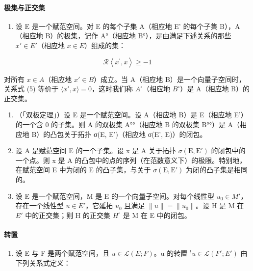 \paragraph{极集与正交集}

\begin{enumerate}
\def\labelenumi{\arabic{enumi})}
\setcounter{enumi}{4}
\tightlist
\item
  设 E 是一个赋范空间。对 E 的每个子集 A（相应地 E' 的每个子集 B），A（相应地 B）的极集，记作 A°（相应地 B°），是由满足下述关系的那些 \(x' \in E'\)（相应地 \(x \in E\)）组成的集：
\end{enumerate}

\[
\mathcal {R} \left<   x ^ {\prime}, x \right> \geqslant - 1\tag{5}
\]

对所有 \(x \in A\)（相应地 \(x' \in B\)）成立。当 A（相应地 B）是一个向量子空间时，关系式 (5) 等价于 \(\langle x', x \rangle = 0\)，这时我们称 \(A^{\circ}\)（相应地 \(B^{\circ}\)）是 A（相应地 B）的正交集。

\begin{enumerate}
\def\labelenumi{\arabic{enumi})}
\setcounter{enumi}{5}
\item
  （「双极定理」）设 E 是一个赋范空间。设 A（相应地 B）是 E（相应地 E'）的一个含 0 的子集。则 A 的双极集 A°°（相应地 B 的双极集 B°°）是 A（相应地 B）的凸包关于拓扑 σ(E, E')（相应地 σ(E', E)）的闭包。
\item
  设 A 是赋范空间 E 的一个子集。设 x 是 A 关于拓扑 \(\sigma(\mathrm{E}, \mathrm{E}')\) 的闭包中的一个点。则 x 是 A 的凸包中的点的序列（在范数意义下）的极限。特别地，在赋范空间 E 中为闭的 E 的凸子集，与关于 \(\sigma(\mathrm{E}, \mathrm{E}')\) 为闭的凸子集是相同的。
\item
   设 E 是一个赋范空间，M 是 E 的一个向量子空间。对每个线性型 \(u_{0} \in M'\)，存在一个线性型 \(u \in E'\)，它延拓 \(u_{0}\) 且满足 \(\|u\| = \|u_{0}\|\)。设 H 是 M 在 \(E'\) 中的正交集；则 H 的正交集 \(H^{\circ}\) 是 M 在 E 中的闭包。
\end{enumerate}

\paragraph{转置}

\begin{enumerate}
\def\labelenumi{\arabic{enumi})}
\setcounter{enumi}{8}
\tightlist
\item
  设 E 与 F 是两个赋范空间，且 \(u \in \mathcal{L}(E; F)\)。u 的转置 \(^{t}u \in \mathcal{L}(F'; E')\) 由下列关系式定义：
\end{enumerate}

